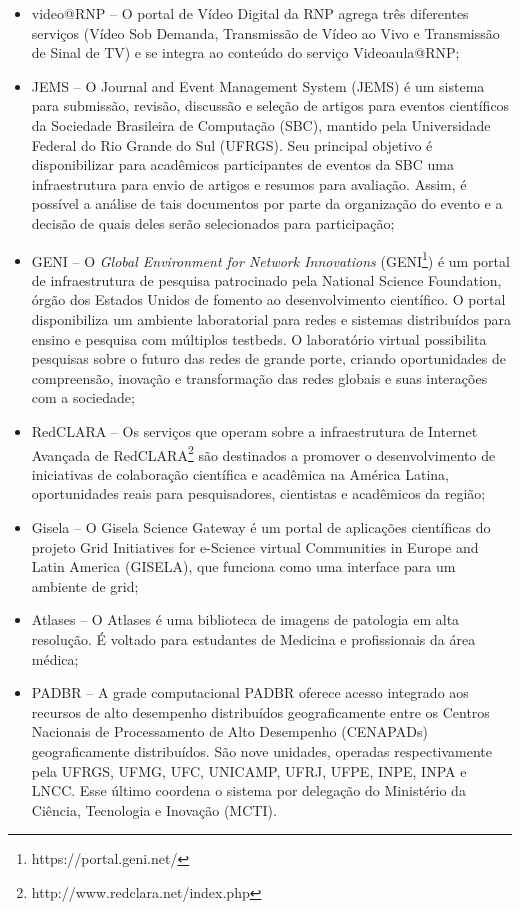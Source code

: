\begin{itemize}
 \item video@RNP -- O portal de Vídeo Digital da RNP agrega três diferentes serviços (Vídeo Sob Demanda, Transmissão de Vídeo ao Vivo e Transmissão de Sinal de TV) e se integra ao conteúdo do serviço Videoaula@RNP;
 \item JEMS -- O Journal and Event Management System (JEMS) é um sistema para submissão, revisão, discussão e seleção de artigos para eventos científicos da Sociedade Brasileira de Computação (SBC), mantido pela Universidade Federal do Rio Grande do Sul (UFRGS). Seu principal objetivo é disponibilizar para acadêmicos participantes de eventos da SBC uma infraestrutura para envio de artigos e resumos para avaliação. Assim, é possível a análise de tais documentos por parte da organização do evento e a decisão de quais deles serão selecionados para participação;
 \item GENI -- O \textit{Global Environment for Network Innovations} (GENI\footnote{https://portal.geni.net/}) é um portal de infraestrutura de pesquisa patrocinado pela National Science Foundation, órgão dos Estados Unidos de fomento ao desenvolvimento científico. O portal disponibiliza um ambiente laboratorial para redes e sistemas distribuídos para ensino e pesquisa com múltiplos testbeds. O laboratório virtual possibilita pesquisas sobre o futuro das redes de grande porte, criando oportunidades de compreensão, inovação e transformação das redes globais e suas interações com a sociedade;
 \item RedCLARA -- Os serviços que operam sobre a infraestrutura de Internet Avançada de RedCLARA\footnote{http://www.redclara.net/index.php} são destinados a promover o desenvolvimento de iniciativas de colaboração científica e acadêmica na América Latina, oportunidades reais para pesquisadores, cientistas e acadêmicos da região;
 \item Gisela -- O Gisela Science Gateway é um portal de aplicações científicas do projeto Grid Initiatives for e-Science virtual Communities in Europe and Latin America (GISELA), que funciona como uma interface para um ambiente de grid;
 \item Atlases -- O Atlases é uma biblioteca de imagens de patologia em alta resolução. É voltado para estudantes de Medicina e profissionais da área médica;
 \item PADBR -- A grade computacional PADBR oferece acesso integrado aos recursos de alto desempenho distribuídos geograficamente entre os Centros Nacionais de Processamento de Alto Desempenho (CENAPADs) geograficamente distribuídos. São nove unidades, operadas respectivamente pela UFRGS, UFMG, UFC, UNICAMP, UFRJ, UFPE, INPE, INPA e LNCC. Esse último coordena o sistema por delegação do Ministério da Ciência, Tecnologia e Inovação (MCTI).
\end{itemize}

